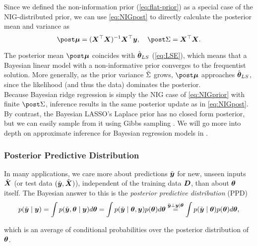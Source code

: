 Since we defined the non-information prior (\autoref{eq:flat-prior}) as a special case of the NIG-distributed prior, we can use \autoref{eq:NIGpost} to directly calculate the posterior mean and variance as
\begin{equation*}
        \mupo = (\bX^\top \bX)^{-1} \bX^\top \by, \quad
        \Sdpo = \bX^\top \bX.
\end{equation*}

The posterior mean $\mupo$ coincides with $\hat{\bm{\theta}}_{LS}$ (\autoref{eq:LSE}), which means that a Bayesian linear model with a non-informative prior converges to the frequentist solution.
More generally, as the prior variance $\breve{\Sigma}$ grows, $\mupo$ approaches $\hat{\bm{\theta}}_{LS}$, since the likelihood (and thus the data) dominates the posterior.\\

Because Bayesian ridge regression is simply the NIG case of \autoref{eq:NIGprior} with finite $\Sdpo$, inference results in the same posterior update as in \autoref{eq:NIGpost}.
By contrast, the Bayesian LASSO's Laplace prior has no closed form posterior, but we can easily sample from it using Gibbs sampling \citep{park_bayesian_2008}.
We will go more into depth on approximate inference for Bayesian regression models in .

\subsubsection*{Posterior Predictive Distribution}
In many applications, we care more about predictions $\tilde{\bm{y}}$ for new, unseen inputs $\tilde{\bm{X}}$ (or test data $(\tilde{\bm{y}}, \tilde{\bm{X}})$), independent of the training data $\bm{D}$, than about $\bm{\theta}$ itself.
The Bayesian answer to this is the \textit{posterior predictive distribution} (PPD) 
\begin{equation*}
    p(\tilde{\bm{y}} \mid \bm{y}) = \int p(\tilde{\bm{y}}, \bm{\theta} \mid \bm{y}) d \bm{\theta} 
    = \int p(\tilde{\bm{y}} \mid \bm{\theta}, \bm{y}) p(\bm{\theta}) d \bm{\theta}
    \overset{\tilde{\bm{y}} \perp \bm{y} \mid \bm{\theta}}{=}  \int p(\tilde{\bm{y}} \mid \bm{\theta}) p(\bm{\theta}) d \bm{\theta},
\end{equation*}

which is an average of conditional probabilities over the posterior distribution of $\bm{\theta}$.\footnotemark


